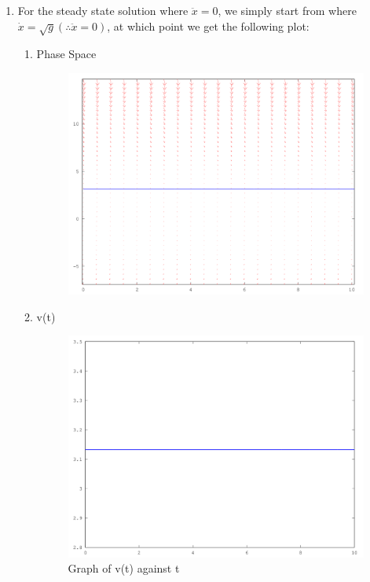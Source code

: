 \documentclass{article}
\begin{document}
\begin{enumerate}
\begin{enumerate}[label*=\arabic*.]
\begin{enumerate}[label=(\alph*)]
	\item For the steady state solution where $\ddot{x}=0$, we simply start from where $\dot{x}=\sqrt{g} (\therefore \ddot{x}=0)$, at which point we get the following plot:
	\begin{enumerate}[label=(\roman*)]	
		\item Phase Space \begin{figure}[H]
			\includegraphics[width=\textwidth]{b_SteadyState}
		\end{figure}
		\item v(t) \begin{figure}[H]
			\caption{Graph of v(t) against t}
			\includegraphics[width=\textwidth]{b_v}
		\end{figure}

\end{enumerate}
\end{enumerate}
\end{enumerate}
\end{enumerate}
\end{document}
